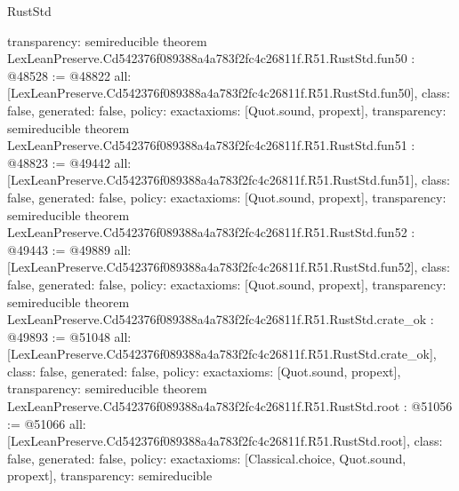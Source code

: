 \begin{lexlean}{RustStd}
\begin{coremodule}
{  transparency: semireducible
}
theorem LexLeanPreserve.Cd542376f089388a4a783f2fc4c26811f.R51.RustStd.fun50 : @48528 := @48822 {
  all: [LexLeanPreserve.Cd542376f089388a4a783f2fc4c26811f.R51.RustStd.fun50],
  class: false,
  generated: false,
  policy: exact{axioms: [Quot.sound, propext]},
  transparency: semireducible
}
theorem LexLeanPreserve.Cd542376f089388a4a783f2fc4c26811f.R51.RustStd.fun51 : @48823 := @49442 {
  all: [LexLeanPreserve.Cd542376f089388a4a783f2fc4c26811f.R51.RustStd.fun51],
  class: false,
  generated: false,
  policy: exact{axioms: [Quot.sound, propext]},
  transparency: semireducible
}
theorem LexLeanPreserve.Cd542376f089388a4a783f2fc4c26811f.R51.RustStd.fun52 : @49443 := @49889 {
  all: [LexLeanPreserve.Cd542376f089388a4a783f2fc4c26811f.R51.RustStd.fun52],
  class: false,
  generated: false,
  policy: exact{axioms: [Quot.sound, propext]},
  transparency: semireducible
}
theorem LexLeanPreserve.Cd542376f089388a4a783f2fc4c26811f.R51.RustStd.crate_ok : @49893 := @51048 {
  all: [LexLeanPreserve.Cd542376f089388a4a783f2fc4c26811f.R51.RustStd.crate_ok],
  class: false,
  generated: false,
  policy: exact{axioms: [Quot.sound, propext]},
  transparency: semireducible
}
theorem LexLeanPreserve.Cd542376f089388a4a783f2fc4c26811f.R51.RustStd.root : @51056 := @51066 {
  all: [LexLeanPreserve.Cd542376f089388a4a783f2fc4c26811f.R51.RustStd.root],
  class: false,
  generated: false,
  policy: exact{axioms: [Classical.choice, Quot.sound, propext]},
  transparency: semireducible
}


\end{coremodule}
\end{lexlean}
